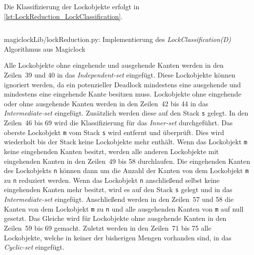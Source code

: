 Die Klassifizierung der Lockobjekte erfolgt in
\cref{lst:LockReduction_LockClassification}.
\begin{listing}[ht]
  \inputminted[frame=lines,linenos,firstline=35,lastline=77]{python}{./Python/magiclockLib/lockReduction.py}
  \caption{magiclockLib/lockReduction.py: Implementierung des \emph{LockClassification(D)} Algorithmus aus Magiclock\autocite[5]{MagicLock}}
  \label{lst:LockReduction_LockClassification}
\end{listing}
Alle Lockobjekte ohne eingehende und ausgehende Kanten werden in den Zeilen~39
und 40 in das \emph{Independent-set} eingefügt. Diese Lockobjekte können
ignoriert werden, da ein potenzieller Deadlock mindestens eine ausgehende und
mindestens eine eingehende Kante besitzen muss. Lockobjekte ohne eingehende oder
ohne ausgehende Kanten werden in den Zeilen~42 bis 44 in das
\emph{Intermediate-set} eingefügt. Zusätzlich werden diese auf den Stack
\texttt{s} gelegt. In den Zeilen~46 bis 69 wird die Klassifizierung für das
\emph{Inner-set} durchgeführt. Das oberste Lockobjekt \texttt{m} vom Stack \texttt{s}
wird entfernt und überprüft. Dies wird wiederholt bis der Stack keine
Lockobjekte mehr enthält. Wenn das Lockobjekt \texttt{m} keine eingehenden
Kanten besitzt, werden alle anderen Lockobjekte mit eingehenden Kanten in den
Zeilen~49 bis 58 durchlaufen. Die eingehenden Kanten des Lockobjekts \texttt{n}
können dann um die Anzahl der Kanten von dem Lockobjekt \texttt{m} zu \texttt{n}
reduziert werden. Wenn das Lockobjekt \texttt{n} anschließend selbst keine
eingehenden Kanten mehr besitzt, wird es auf den Stack \texttt{s} gelegt und in
das \emph{Intermediate-set} eingefügt. Anschließend werden in den Zeilen~57 und
58 die Kanten von dem Lockobjekt \texttt{m} zu \texttt{n} und alle ausgehenden
Kanten von \texttt{m} auf null gesetzt. Das Gleiche wird für Lockobjekte ohne
ausgehende Kanten in den Zeilen~59 bis 69 gemacht. Zuletzt werden in den
Zeilen~71 bis 75 alle Lockobjekte, welche in keiner der bisherigen Mengen
vorhanden sind, in das \emph{Cyclic-set} eingefügt.

